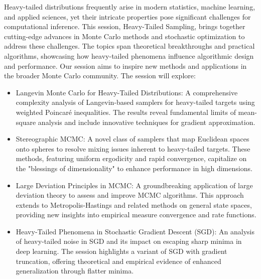 \documentclass[12pt,lettersize,oneside]{book} %
\begin{document}
\begin{session}
 {}%
 {}%
 Heavy-tailed distributions frequently arise in modern statistics, machine learning, and applied sciences, yet their intricate properties pose significant challenges for computational inference. This session, Heavy-Tailed Sampling, brings together cutting-edge advances in Monte Carlo methods and stochastic optimization to address these challenges. The topics span theoretical breakthroughs and practical algorithms, showcasing how heavy-tailed phenomena influence algorithmic design and performance. Our session aims to inspire new methods and applications in the broader Monte Carlo community. The session will explore:
 \begin{itemize}
 \item
 Langevin Monte Carlo for Heavy-Tailed Distributions: A comprehensive complexity analysis of Langevin-based samplers for heavy-tailed targets using weighted Poincar\'e inequalities. The results reveal fundamental limits of mean-square analysis and include innovative techniques for gradient approximation.
 \item
 Stereographic MCMC: A novel class of samplers that map Euclidean spaces onto spheres to resolve mixing issues inherent to heavy-tailed targets. These methods, featuring uniform ergodicity and rapid convergence, capitalize on the "blessings of dimensionality" to enhance performance in high dimensions.
 \item
 Large Deviation Principles in MCMC: A groundbreaking application of large deviation theory to assess and improve MCMC algorithms. This approach extends to Metropolis-Hastings and related methods on general state spaces, providing new insights into empirical measure convergence and rate functions.
 \item
 Heavy-Tailed Phenomena in Stochastic Gradient Descent (SGD): An analysis of heavy-tailed noise in SGD and its impact on escaping sharp minima in deep learning. The session highlights a variant of SGD with gradient truncation, offering theoretical and empirical evidence of enhanced generalization through flatter minima.
 \end{itemize}
\end{session}


\end{document}
